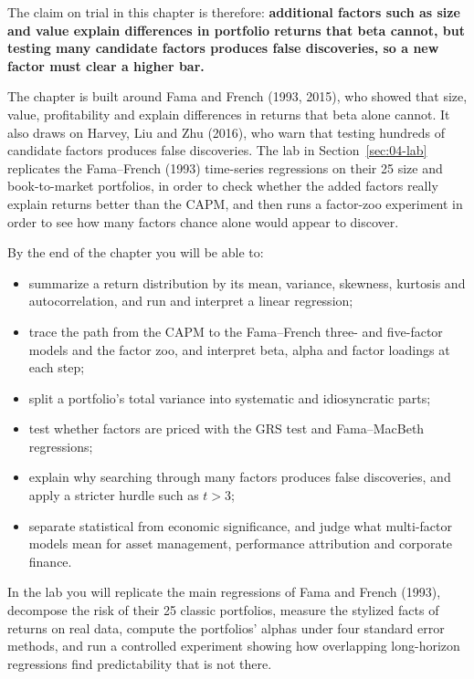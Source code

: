 The claim on trial in this chapter is therefore: \textbf{additional factors such as size and value explain differences in portfolio returns that beta cannot, but testing many candidate factors produces false discoveries, so a new factor must clear a higher bar.}

The chapter is built around Fama and French (1993, 2015), who showed that size, value, profitability and  explain differences in returns that beta alone cannot. It also draws on Harvey, Liu and Zhu (2016), who warn that testing hundreds of candidate factors produces false discoveries. The lab in Section~\ref{sec:04-lab} replicates the Fama--French (1993) time-series regressions on their 25 size and book-to-market portfolios, in order to check whether the added factors really explain returns better than the CAPM, and then runs a factor-zoo experiment in order to see how many factors chance alone would appear to discover.

By the end of the chapter you will be able to:
\begin{itemize}
  \item summarize a return distribution by its mean, variance, skewness, kurtosis and autocorrelation, and run and interpret a linear regression;
  \item trace the path from the CAPM to the Fama--French three- and five-factor models and the factor zoo, and interpret beta, alpha and factor loadings at each step;
  \item split a portfolio's total variance into systematic and idiosyncratic parts;
  \item test whether factors are priced with the GRS test and Fama--MacBeth regressions;
  \item explain why searching through many factors produces false discoveries, and apply a stricter hurdle such as $t > 3$;
  \item separate statistical from economic significance, and judge what multi-factor models mean for asset management, performance attribution and corporate finance.
\end{itemize}

In the lab you will replicate the main regressions of Fama and French (1993), decompose the risk of their 25 classic portfolios, measure the stylized facts of returns on real data, compute the portfolios' alphas under four standard error methods, and run a controlled experiment showing how overlapping long-horizon regressions find predictability that is not there.


